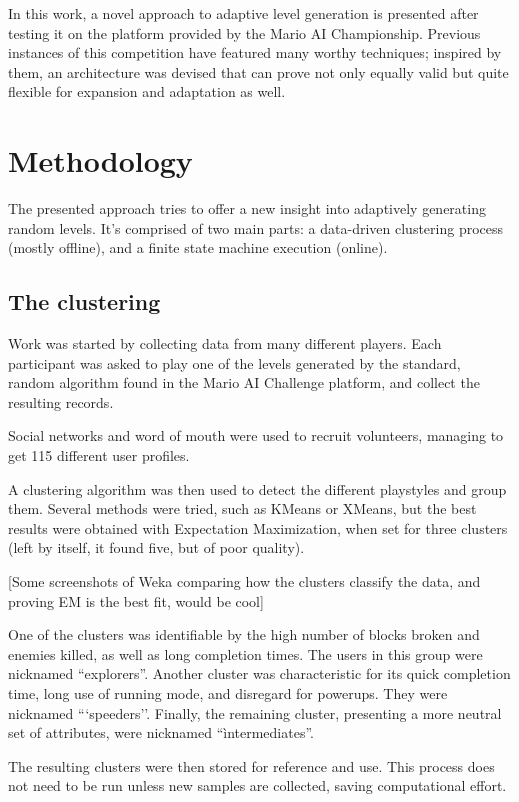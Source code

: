 \documentclass[conference]{IEEEtran}
\begin{document}
In this work, a novel approach to adaptive level generation is presented after testing it on the platform provided by the Mario AI Championship. Previous instances of this competition have featured many worthy techniques; inspired by them, an architecture was devised that can prove not only equally valid but quite flexible for expansion and adaptation as well.

\section{Methodology}

The presented approach tries to offer a new insight into adaptively generating random levels. It's comprised of two main parts: a data-driven clustering process (mostly offline), and a finite state machine execution (online).

\subsection*{The clustering}

Work was started by collecting data from many different players. Each participant was asked to play one of the levels generated by the standard, random algorithm found in the Mario AI Challenge platform, and collect the resulting records.

Social networks and word of mouth were used to recruit volunteers, managing to get 115 different user profiles.

A clustering algorithm was then used to detect the different playstyles and group them. Several methods were tried, such as KMeans or XMeans, but the best results were obtained with Expectation Maximization, when set for three clusters (left by itself, it found five, but of poor quality).

[Some screenshots of Weka comparing how the clusters classify the data, and proving EM is the best fit, would be cool]

One of the clusters was identifiable by the high number of blocks broken and enemies killed, as well as long completion times. The users in this group were nicknamed ``explorers''. Another cluster was characteristic for its quick completion time, long use of running mode, and disregard for powerups. They were nicknamed ```speeders''. Finally, the remaining cluster, presenting a more neutral set of attributes, were nicknamed ``ìntermediates''.

The resulting clusters were then stored for reference and use. This process does not need to be run unless new samples are collected, saving computational effort.
\end{document}

